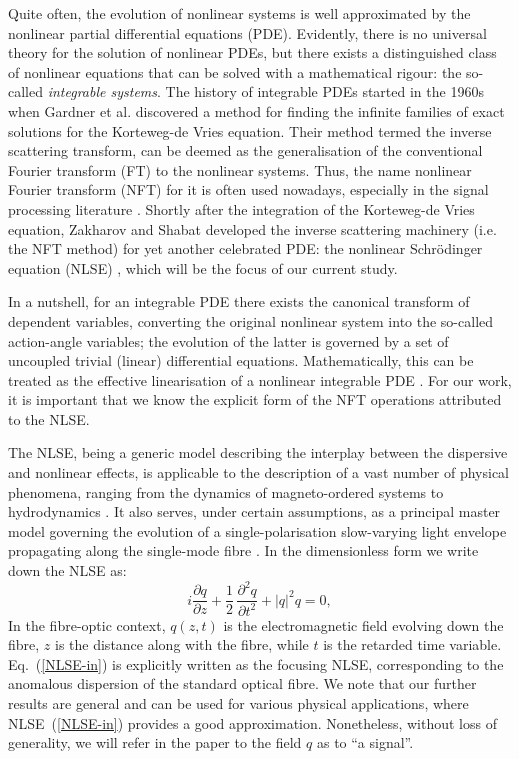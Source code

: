 \label{sec:intro}
Quite often, the evolution of nonlinear systems is well approximated by the nonlinear partial differential equations (PDE). Evidently, there is no universal theory for the solution of nonlinear PDEs, but there exists a distinguished class of nonlinear equations that can be solved with a mathematical rigour: the so-called \textit{integrable systems}. The history of integrable PDEs started in the 1960s when Gardner et al. \cite{ggk67} discovered a method for finding the infinite families of exact solutions for the  Korteweg-de Vries equation. Their method termed the inverse scattering transform, can be deemed as the generalisation of the conventional Fourier transform (FT) to the nonlinear systems. Thus, the name nonlinear Fourier transform (NFT) for it is often used nowadays, especially in the signal processing literature \cite{yk14-1,tplwfkd17}. Shortly after the integration of the Korteweg-de Vries equation, Zakharov and Shabat developed the inverse scattering machinery (i.e. the NFT method) for yet another celebrated PDE: the nonlinear Schr\"odinger equation (NLSE) \cite{zs72}, which will be the focus of our current study.  

In a nutshell, for an integrable PDE there exists the canonical transform of dependent variables, converting the original nonlinear system into the so-called action-angle variables; the evolution of the latter is governed by a set of uncoupled trivial (linear) differential equations. Mathematically, this can be treated as the effective linearisation of a nonlinear integrable PDE \cite{akn74,nmp84}. For our work, it is important that we know the explicit form of the NFT operations attributed to the NLSE.

The NLSE, being a generic model describing the interplay between the dispersive and nonlinear effects, is applicable to the description of a vast number of physical phenomena, ranging from the dynamics of magneto-ordered systems \cite{kik90} to hydrodynamics \cite{o10}. It also serves, under certain assumptions, as a principal master model governing the evolution of a single-polarisation slow-varying light envelope propagating along the single-mode fibre \cite{a12,mg06}. In the dimensionless form we write down the NLSE as: 
\begin{equation}
i \frac{\partial q}{\partial z} + \frac{1}{2}\,\frac{\partial^2 q}{\partial t^2} + |q|^2 q = 0 ,
\label{NLSE-in}
\end{equation}
In the fibre-optic context, $q(z,t)$ is the electromagnetic field evolving down the fibre, $z$ is the distance along with the fibre, while $t$ is the retarded time variable. Eq.~(\ref{NLSE-in}) is explicitly written as the focusing NLSE, corresponding to the anomalous dispersion of the standard optical fibre. We note that our further results are general and can be used for various physical applications, where NLSE~(\ref{NLSE-in}) provides a good approximation. Nonetheless, without loss of generality, we will refer in the paper to the field $q$ as to ``a signal''.

